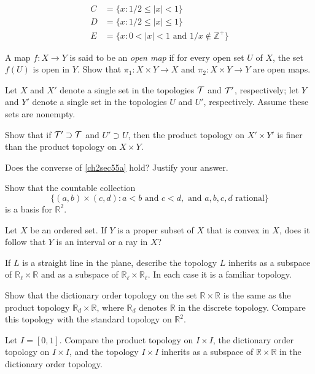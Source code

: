 \begin{exercise}
\begin{align*}
    C & = \{x\colon 1/2\leq \lvert x\rvert < 1\}\\
    D & = \{x\colon 1/2\leq \lvert x\rvert\leq 1\}\\
    E & = \{x\colon 0 < \lvert x\rvert < 1\text{ and } 1/x\not\in\mathbb{Z}^+\}
  \end{align*}
\item
  A map \(f\colon X\to Y\) is said to be an \textit{open map} if for every open
  set \(U\) of \(X\), the set \(f(U)\) is open in \(Y\).
  Show that \(\pi_1\colon X\times Y\to X\) and \(\pi_2\colon X\times Y\to Y\)
  are open maps.
\item
  Let \(X\) and \(X'\) denote a single set in the topologies \(\mathcal{T}\) and
  \(\mathcal{T}'\), respectively; let \(Y\) and \(Y'\) denote a single set in the
  topologies \(U\) and \(U'\), respectively.
  Assume these sets are nonempty.
  \begin{exercise}[label = (\alph*), ref = \arabic{exercisei} (\alph*)]
  \item
    \label{ch2sec55a}
    Show that if \(\mathcal{T}'\supset\mathcal{T}\) and \(U'\supset U\), then the product
    topology on \(X'\times Y'\) is finer than the product topology on
    \(X\times Y\).
  \item
    Does the converse of \cref{ch2sec55a} hold?
    Justify your answer.
  \end{exercise}
\item
  Show that the countable collection
  \[
  \{(a, b)\times (c, d)\colon a < b\text{ and } c < d, \text{ and } a, b, c, d
  \text{ rational}\}
  \]
  is a basis for \(\mathbb{R}^2\).
\item
  Let \(X\) be an ordered set.
  If \(Y\) is a proper subset of \(X\) that is convex in \(X\), does it follow
  that \(Y\) is an interval or a ray in \(X\)?
\item
  If \(L\) is a straight line in the plane, describe the topology \(L\)
  inherits as a subspace of \(\mathbb{R}_{\ell}\times\mathbb{R}\) and as a
  subspace of \(\mathbb{R}_{\ell}\times\mathbb{R}_{\ell}\).
  In each case it is a familiar topology.
\item
  Show that the dictionary order topology on the set
  \(\mathbb{R}\times\mathbb{R}\) is the same as the product topology
  \(\mathbb{R}_d\times\mathbb{R}\), where \(\mathbb{R}_d\) denotes
  \(\mathbb{R}\) in the discrete topology.
  Compare this topology with the standard topology on \(\mathbb{R}^2\).
\item
  Let \(I = [0,1]\).
  Compare the product topology on \(I\times I\), the dictionary order topology
  on \(I\times I\), and the topology \(I\times I\) inherits as a subspace of
  \(\mathbb{R}\times\mathbb{R}\) in the dictionary order topology.
\end{exercise}

